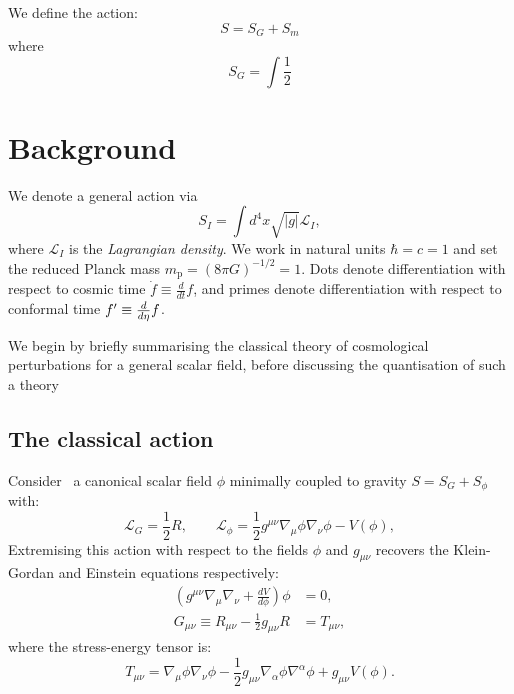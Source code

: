 We define the action:
\begin{equation}
  S = S_G + S_m
  \label{eqn:cos:action}
\end{equation}
where
\begin{equation}
  S_G = \int \frac{1}{2}
  \label{}
\end{equation}

\section{Background}
\label{sec:background}

\clearpage{}

We denote a general action via
\begin{equation}
  S_I = \int d^4x\sqrt{|g|}\mathcal{L}_I,
  \label{eqn:general_action}
\end{equation}
where $\mathcal{L}_I$ is the {\em Lagrangian density}. We work in natural units $\hbar=c=1$ and set the reduced Planck mass $m_\mathrm{p} = {(8\pi G)}^{-1/2} = 1$. Dots denote differentiation with respect to cosmic time $\dot{f}\equiv \frac{d}{dt}f$, and primes denote differentiation with respect to conformal time ${{f}^\prime}\equiv\frac{d}{d\eta}f$.

We begin by briefly summarising the classical theory of cosmological perturbations for a general scalar field, before discussing the quantisation of such a theory


\subsection{The classical action}
\label{sec:inflation}
Consider~\cite{Baumann+2009} a canonical scalar field $\phi$ minimally coupled to gravity $S= S_G + S_\phi$ with:
\begin{equation}
  \mathcal{L}_G = \frac{1}{2}R, 
  \qquad
  \mathcal{L}_\phi = \frac{1}{2}g^{\mu\nu}\nabla_\mu\phi\nabla_\nu\phi - V(\phi),
  \label{eqn:action}
\end{equation}
Extremising this action with respect to the fields $\phi$ and $g_{\mu\nu}$ recovers the Klein-Gordan and Einstein equations respectively:
\begin{align}
  \left( g^{\mu\nu}\nabla_\mu\nabla_\nu + \frac{dV}{d\phi} \right) \phi &= 0,
  \label{eqn:klein_gordon}\\
  G_{\mu\nu}\equiv R_{\mu\nu}-\frac{1}{2}g_{\mu\nu}R&= T_{\mu\nu},
  \label{eqn:einstein}
\end{align}
where the stress-energy tensor is:
\begin{equation}
  T_{\mu\nu} = \nabla_\mu\phi \nabla_\nu\phi - \frac{1}{2}g_{\mu\nu} \nabla_\alpha\phi \nabla^\alpha\phi +g_{\mu\nu} V(\phi).
  \label{eqn:SET}
\end{equation}

